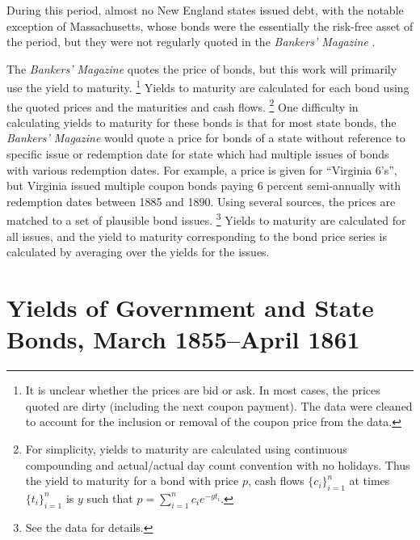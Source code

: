 During this period, almost no New England states issued debt, with the notable exception of Massachusetts, whose bonds were the essentially the risk-free asset of the period, but they were not regularly quoted in the \textit{Bankers' Magazine} \parencites[86]{Martin1871}{HomerSylla2005}{Macaulay1938}[80-85]{Officer2003}.

The \textit{Bankers' Magazine} quotes the price of bonds, but this work will primarily use the yield to maturity.%
\footnote{It is unclear whether the prices are bid or ask. In most cases, the prices quoted are dirty (including the next coupon payment). The data were cleaned to account for the inclusion or removal of the coupon price from the data.}
Yields to maturity are calculated for each bond using the quoted prices and the maturities and cash flows.
\footnote{
  For simplicity, yields to maturity are calculated using continuous compounding and actual/actual day count convention with no holidays.
  Thus the yield to maturity for a bond with price $p$, cash flows $\{c_{i}\}_{i = 1}^{n}$ at times $\{t_{i}\}_{i=1}^{n}$ is $y$ such that $p = \sum_{i=1}^{n} c_{i} e^{- y t_{i}}$.
}
One difficulty in calculating yields to maturity for these bonds is that for most state bonds, the \textit{Bankers' Magazine} would quote a price for bonds of a state without reference to specific issue or redemption date for state which had multiple issues of bonds with various redemption dates.
For example, a price is given for ``Virginia 6's'', but Virginia issued multiple coupon bonds paying 6 percent semi-annually with redemption dates between 1885 and 1890.
Using several sources, the prices are matched to a set of plausible bond issues.%
\footnote{See the data for details.}
Yields to maturity are calculated for all issues, and the yield to maturity corresponding to the bond price series is calculated by averaging over the yields for the issues.

\section{Yields of Government and State Bonds, March 1855--April 1861}
\label{acw_onset:sec:yields-governm-state}


